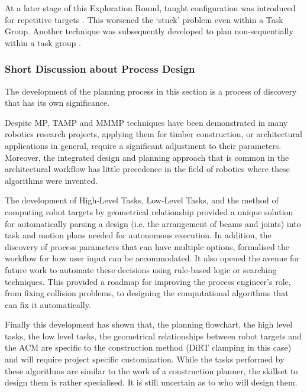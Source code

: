 At a later stage of this Exploration Round, taught configuration was introduced for repetitive targets . This worsened the ‘stuck’ problem even within a Task Group. Another technique was subsequently developed to plan non-sequentially within a task group .

\subsubsection{Short Discussion about Process Design}
\label{subsubsection:exploration-3-short-discussion-about-process-design}

The development of the planning process in this section is a process of discovery that has its own significance.

Despite MP, TAMP and MMMP techniques have been demonstrated in many robotics research projects, applying them for timber construction, or architectural applications in general, require a significant adjustment to their parameters. Moreover, the integrated design and planning approach that is common in the architectural workflow has little precedence in the field of robotics where these algorithms were invented.

The development of High-Level Tasks, Low-Level Tasks, and the method of computing robot targets by geometrical relationship provided a unique solution for automatically parsing a design (i.e. the arrangement of beams and joints) into task and motion plans needed for autonomous execution. In addition, the discovery of process parameters that can have multiple options, formalised the workflow for how user input can be accommodated. It also opened the avenue for future work to automate these decisions using rule-based logic or searching techniques. This provided a roadmap for improving the process engineer’s role, from fixing collision problems, to designing the computational algorithms that can fix it automatically.

Finally this development has shown that, the planning flowchart, the high level tasks, the low level tasks, the geometrical relationships between robot targets and the ACM are specific to the construction method (DiRT clamping in this case) and will require project specific customization. While the tasks performed by these algorithms are similar to the work of a construction planner, the skillset to design them is rather specialised. It is still uncertain as to who will design them.

